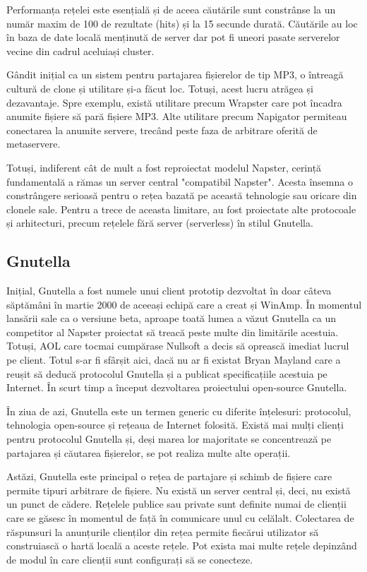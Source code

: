 Performanța rețelei este esențială și de aceea căutările sunt constrânse la un
număr maxim de 100 de rezultate (hits) și la 15 secunde durată. Căutările au
loc în baza de date locală menținută de server dar pot fi uneori pasate
serverelor vecine din cadrul aceluiași cluster.

Gândit inițial ca un sistem pentru partajarea fișierelor de tip MP3, o
întreagă cultură de clone și utilitare și-a făcut loc. Totuși, acest lucru
atrăgea și dezavantaje. Spre exemplu, există utilitare precum Wrapster care
pot încadra anumite fișiere să pară fișiere MP3. Alte utilitare precum
Napigator permiteau conectarea la anumite servere, trecând peste faza de
arbitrare oferită de metaservere.

Totuși, indiferent cât de mult a fost reproiectat modelul Napster, cerință
fundamentală a rămas un server central "compatibil Napster". Acesta însemna o
constrângere serioasă pentru o rețea bazată pe această tehnologie sau oricare
din clonele sale. Pentru a trece de aceasta limitare, au fost proiectate alte
protocoale și arhitecturi, precum rețelele fără server (serverless) în stilul
Gnutella.

\subsection{Gnutella}

Inițial, Gnutella a fost numele unui client prototip dezvoltat în doar câteva
săptămâni în martie 2000 de aceeași echipă care a creat și WinAmp. În momentul
lansării sale ca o versiune beta, aproape toată lumea a văzut Gnutella ca un
competitor al Napster proiectat să  treacă peste multe din limitările
acestuia. Totuși, AOL care tocmai cumpărase Nullsoft a decis să oprească
imediat lucrul pe client. Totul s-ar fi sfârșit aici, dacă nu ar fi existat
Bryan Mayland care a reușit să deducă protocolul Gnutella și a publicat
specificațiile acestuia pe Internet. În scurt timp a început dezvoltarea
proiectului open-source Gnutella.

În ziua de azi, Gnutella este un termen generic cu diferite înțelesuri:
protocolul, tehnologia open-source și rețeaua de Internet folosită. Există mai
mulți clienți pentru protocolul Gnutella și, deși marea lor majoritate se
concentrează pe partajarea și căutarea fișierelor, se pot realiza multe alte
operații.

Astăzi, Gnutella este principal o rețea de partajare și schimb de fișiere care
permite tipuri arbitrare de fișiere. Nu există un server central și, deci, nu
există un punct de cădere. Rețelele publice sau private sunt definite numai de
clienții care se găsesc în momentul de față în comunicare unul cu celălalt.
Colectarea de răspunsuri la anunțurile clienților din rețea permite fiecărui
utilizator să construiască o hartă locală a aceste rețele. Pot exista mai
multe rețele depinzând de modul în care clienții sunt configurați să se
conecteze.

